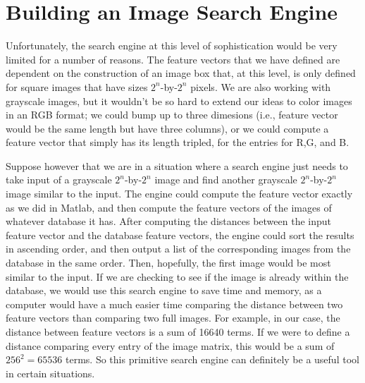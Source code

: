 \documentclass[11 pt]{article}
\begin{document}
\section{Building an Image Search Engine}

\indent\indent Unfortunately, the search engine at this level of sophistication would be very limited for a number of reasons. The feature vectors that we have defined are dependent on the construction of an image box that, at this level, is only defined for square images that have sizes $2^n$-by-$2^n$ pixels. We are also working with grayscale images, but it wouldn't be so hard to extend our ideas to color images in an RGB format; we could bump up to three dimesions (i.e., feature vector would be the same length but have three columns), or we could compute a feature vector that simply has its length tripled, for the entries for R,G, and B.

Suppose however that we are in a situation where a search engine just needs to take input of a grayscale $2^n$-by-$2^n$ image and find another grayscale $2^n$-by-$2^n$ image similar to the input. The engine could compute the feature vector exactly as we did in Matlab, and then compute the feature vectors of the images of whatever database it has. After computing the distances between the input feature vector and the database feature vectors, the engine could sort the results in ascending order, and then output a list of the corresponding images from the database in the same order. Then, hopefully, the first image would be most similar to the input. If we are checking to see if the image is already within the database, we would use this search engine to save time and memory, as a computer would have a much easier time comparing the distance between two feature vectors than comparing two full images. For example, in our case, the distance between feature vectors is a sum of 16640 terms. If we were to define a distance comparing every entry of the image matrix, this would be a sum of $256^2=65536$ terms. So this primitive search engine can definitely be a useful tool in certain situations.
\end{document}

